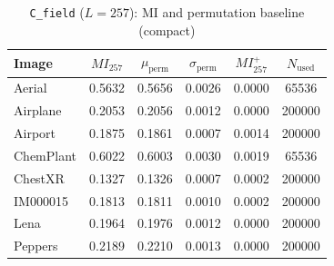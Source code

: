 \begin{table}[ht!]
{%
\begin{subtable}[t]{\columnwidth}
\caption{\texttt{C\_field} ($L=257$): MI and permutation baseline (compact)}
\label{stab:mi_z257_compact}
\centering
\begin{tabular*}{\columnwidth}{@{\extracolsep{\fill}}l
    S[table-format=1.4]
    S[table-format=1.4]
    S[table-format=1.4]
    S[table-format=1.4]
    S[table-format=6.0] @{}}
\hline
\textbf{Image} &
 &
 &
 &
 &
 \\
\hline
Aerial     & 0.5632 & 0.5656 & 0.0026 & 0.0000 &  65536 \\
Airplane   & 0.2053 & 0.2056 & 0.0012 & 0.0000 & 200000 \\
Airport    & 0.1875 & 0.1861 & 0.0007 & 0.0014 & 200000 \\
ChemPlant  & 0.6022 & 0.6003 & 0.0030 & 0.0019 &  65536 \\
ChestXR    & 0.1327 & 0.1326 & 0.0007 & 0.0002 & 200000 \\
IM000015   & 0.1813 & 0.1811 & 0.0010 & 0.0002 & 200000 \\
Lena       & 0.1964 & 0.1976 & 0.0012 & 0.0000 & 200000 \\
Peppers    & 0.2189 & 0.2210 & 0.0013 & 0.0000 & 200000 \\
\hline
\end{tabular*}
\end{subtable}
}
\end{table}

